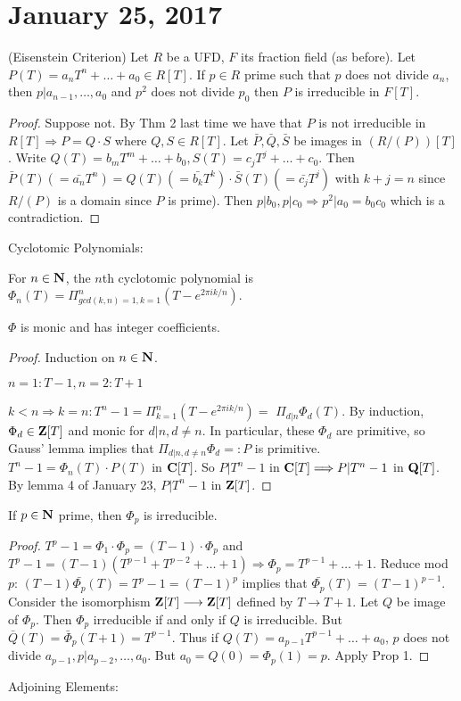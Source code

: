 \section{January 25, 2017}

\begin{prop}
(Eisenstein Criterion) Let $R$ be a UFD, $F$ its fraction field (as before). Let $P(T)=a_nT^n+\ldots+a_0\in R[T]$. If $p\in R$ prime such that $p$ does not divide $a_n$, then $p|a_{n-1},\ldots,a_0$ and $p^2$ does not divide $p_0$ then $P$ is irreducible in $F[T]$.
\end{prop}
\begin{proof}
Suppose not. By Thm 2 last time we have that $P$ is not irreducible in $R[T]\Longrightarrow P=Q\cdot S$ where $Q,S\in R[T].$ Let $\bar{P},\bar{Q},\bar{S}$ be images in $(R/(P))[T]$. Write $Q(T)=b_mT^m+\ldots+b_0, S(T)=c_jT^j+\ldots+c_0$. Then $\bar{P}(T)(=\bar{a_n}T^n)=Q(T)(=\bar{b_k}T^k)\cdot \bar{S}(T)(=\bar{c_j}T^j)$ with $k+j=n$ since $R/(P)$ is a domain since $P$ is prime). Then $p|b_0,p|c_0\Longrightarrow p^2|a_0=b_0c_0$ which is a contradiction.
\end{proof}
Cyclotomic Polynomials:
\begin{defn}
For $n\in\bold{N}$, the $n$th cyclotomic polynomial is $\Phi_n(T)=\Pi_{gcd(k,n)=1,k=1}^n(T-e^{2\pi ik/n})$.
\end{defn}
\begin{prop}
$\Phi$ is monic and has integer coefficients.
\end{prop}
\begin{proof}
Induction on $n\in\bold{N}$.

$n=1: T-1,n=2: T+1$

$k<n\Longrightarrow k=n:T^n-1=\Pi_{k=1}^n(T-e^{2\pi ik/n})=$
$\Pi_{d|n}\Phi_d(T)$. By induction, $\Phi_d\in\bold{Z}[T]$ and monic for $d|n, d\ne n$. In particular, these $\Phi_d$ are primitive, so Gauss' lemma implies that $\Pi_{d|n,d\ne n}\Phi_d=:P$ is primitive. $T^n-1=\Phi_n(T)\cdot P(T)$ in $\bold{C}[T]$. So $P|T^n-1$ in $\bold{C}[T]\Longrightarrow P|T^n-1$ in $\bold{Q}[T]$. By lemma 4 of January 23, $P|T^n-1$ in $\bold{Z}[T]$.
\end{proof}
\begin{prop}
If $p\in\bold{N}$ prime, then $\Phi_p$ is irreducible.
\end{prop}
\begin{proof}
$T^p-1=\Phi_1\cdot \Phi_p=(T-1)\cdot\Phi_p$ and $T^p-1=(T-1)(T^{p-1}+T^{p-2}+\ldots+1)\Longrightarrow \Phi_p=T^{p-1}+\ldots+1.$ Reduce mod $p$: $(T-1)\bar{\Phi_p}(T)=T^p-1=(T-1)^p$ implies that $\bar{\Phi_p}(T)=(T-1)^{p-1}$. Consider the isomorphism $\bold{Z}[T]\longrightarrow \bold{Z}[T]$ defined by $T\longrightarrow T+1$. Let $Q$ be image of $\Phi_p$. Then $\Phi_p$ irreducible if and only if $Q$ is irreducible. But $\bar{Q}(T)=\bar{\Phi}_p(T+1)=T^{p-1}$. Thus if $Q(T)=a_{p-1}T^{p-1}+\ldots+a_0$, $p$ does not divide $a_{p-1},p|a_{p-2},\ldots,a_0$. But $a_0=Q(0)=\Phi_p(1)=p$. Apply Prop 1.
\end{proof}
Adjoining Elements:

